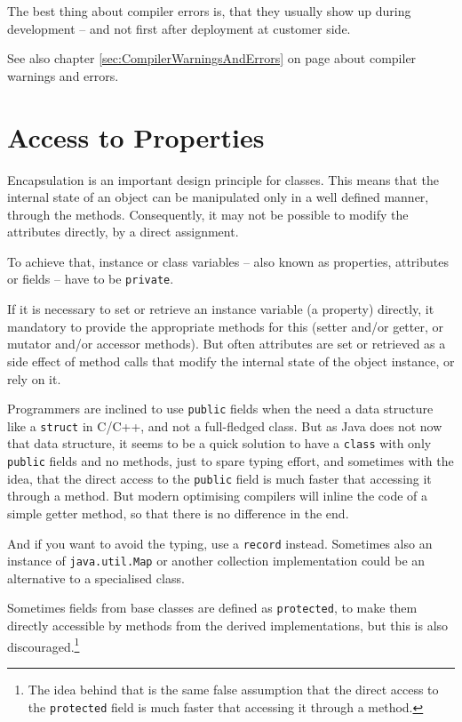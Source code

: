 \documentclass[11pt,a4paper, titlepage, parskip=half, headsepline, footsepline, cleardoublepage=current, headheight=1cm]{scrbook}
\newcommand*{\tqvref}[1]{\hyperref[{#1}]{\ref*{#1}} on page \pageref{#1}}
\begin{document}
The best thing about compiler errors is, that they usually show up during development – and not first after deployment at customer side.

See also chapter \tqvref{sec:CompilerWarningsAndErrors} about compiler warnings and errors.

\section{Access to Properties}
Encapsulation is an important design principle for classes. This means that the internal state of an object can be manipulated only in a well defined manner, through the methods. Consequently, it may not be possible to modify the attributes  directly, by a direct assignment.

To achieve that, instance or class variables – also known as properties, attributes or fields – have to be \lstinline|private|.

If it is necessary to set or retrieve an instance variable (a property) directly, it mandatory to provide the appropriate methods for this (setter and/or getter, or mutator and/or accessor methods). But often attributes are set or retrieved as a side effect of method calls that modify the internal state of the object instance, or rely on it.

Programmers are inclined to use \lstinline|public| fields when the need a data structure like a \lstinline|struct| in C/C++, and not a full-fledged class. But as Java does not now that data structure, it seems to be a quick solution to have a \lstinline|class| with only \lstinline|public| fields and no methods, just to spare typing effort, and sometimes with the idea, that the direct access to the \lstinline|public| field is much faster that accessing it through a method. But modern optimising compilers will inline the code of a simple getter method, so that there is no difference in the end.

And if you want to avoid the typing, use a \lstinline|record|\autocite{ORACLE_DOC_RECORD,ORACLE_DOC_LANGUAGE_SPECIFICATION:RecordClasses} instead. Sometimes also an instance of \lstinline|java.util.Map| or another collection implementation could be an alternative to a specialised class.
 
Sometimes fields from base classes are defined as \lstinline|protected|, to make them directly accessible by methods from the derived implementations, but this is also discouraged.\footnote{The idea behind that is the same false assumption that the direct access to the \lstinline|protected| field is much faster that accessing it through a method.}
\end{document}
